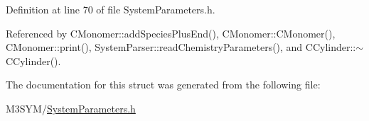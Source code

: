 Definition at line 70 of file System\+Parameters.\+h.



Referenced by C\+Monomer\+::add\+Species\+Plus\+End(), C\+Monomer\+::\+C\+Monomer(), C\+Monomer\+::print(), System\+Parser\+::read\+Chemistry\+Parameters(), and C\+Cylinder\+::$\sim$\+C\+Cylinder().



The documentation for this struct was generated from the following file\+:\begin{DoxyCompactItemize}
\item 
M3\+S\+Y\+M/\hyperlink{SystemParameters_8h}{System\+Parameters.\+h}\end{DoxyCompactItemize}
